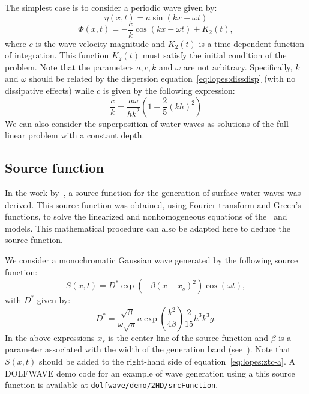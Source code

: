 The simplest case is to consider a periodic wave given by:
\begin{equation}\label{eq:lopes:dirichleteta}
\eta(x,t)=a \sin(kx-\omega t)
\end{equation}
\begin{equation}\label{eq:lopes:dirichletphi}
\Phi(x,t)=-\frac{c}{k}\cos(k x-\omega t)+K_2(t),
\end{equation}
where $c$ is the wave velocity magnitude and $K_2(t)$ is a
time dependent function of integration.  This function
$K_2(t)$ must satisfy the initial condition of the problem.
Note that the parameters $a,c,k$ and $\omega$ are not
arbitrary. Specifically, $k$ and $\omega$ should be related
by the dispersion equation~\eqref{eq:lopes:dissdisp} (with no
dissipative effects) while $c$ is given by the following
expression:
\begin{equation}
\frac{c}{k}=\frac{a\omega}{hk^2}\left(1+\frac{2}{5}(kh)^2\right)
\end{equation}
  We can also
consider the superposition of water waves as solutions of
the full linear problem with a constant depth.

\subsection{Source function}
In the work by~\citet{WeiKirbySinha1999}, a source
function for the generation of
surface water waves was derived.  This source function was
obtained, using Fourier transform and Green's functions, to
solve the linearized and nonhomogeneous equations of
the~\citet{Peregrine1967} and~\citet{Nwogu1993} models.  This
mathematical procedure can also be adapted here to deduce
the source function.

We consider a monochromatic Gaussian wave generated by the
following source function:
\begin{equation}\label{eq:lopes:src}
S(x,t)=D^* \exp(-\beta (x-x_s)^2)\cos(\omega t),
\end{equation}
with $D^*$ given by:
\begin{equation}
\displaystyle
D^*=\frac{\sqrt{\beta}}{\omega\sqrt{\pi}}a\exp(\frac{k^2}{4\beta})\frac{2}{15}h^3k^3g.
\end{equation}
In the above expressions $x_s$ is the center line of the
source function and $\beta$ is a parameter associated with
the width of the generation band
(see~\citet{WeiKirbySinha1999}).  Note that $S(x,t)$ should
be added to the right-hand side of
equation~\eqref{eq:lopes:ztc-a}.
A DOLFWAVE demo
code for an example of wave generation using a this source
function is  available at {\tt dolfwave/demo/2HD/srcFunction}.

